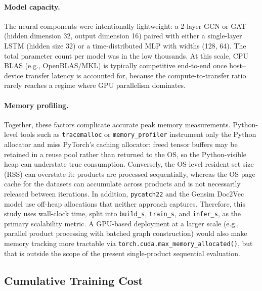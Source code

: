 \paragraph{Model capacity.}
The neural components were intentionally lightweight: a 2-layer GCN or GAT (hidden dimension 32, output dimension 16) paired with either a single-layer LSTM (hidden size 32) or a time-distributed MLP with widths (128, 64). The total parameter count per model was in the low thousands. At this scale, CPU BLAS (e.g., OpenBLAS/MKL) is typically competitive end-to-end once host--device transfer latency is accounted for, because the compute-to-transfer ratio rarely reaches a regime where GPU parallelism dominates.

\paragraph{Memory profiling.}
Together, these factors complicate accurate peak memory measurements. Python-level tools such as \texttt{tracemalloc} or \texttt{memory\_profiler} instrument only the Python allocator and miss PyTorch's caching allocator: freed tensor buffers may be retained in a reuse pool rather than returned to the OS, so the Python-visible heap can understate true consumption. Conversely, the OS-level resident set size (RSS) can overstate it: products are processed sequentially, whereas the OS page cache for the datasets can accumulate across products and is not necessarily released between iterations. In addition, \texttt{pycatch22} and the Gensim Doc2Vec model use off-heap allocations that neither approach captures. Therefore, this study uses wall-clock time, split into \texttt{build\_s}, \texttt{train\_s}, and \texttt{infer\_s}, as the primary scalability metric. A GPU-based deployment at a larger scale (e.g., parallel product processing with batched graph construction) would also make memory tracking more tractable via \texttt{torch.cuda.max\_memory\_allocated()}, but that is outside the scope of the present single-product sequential evaluation.
\subsection{Cumulative Training Cost}
\label{sec:scalability-train}


